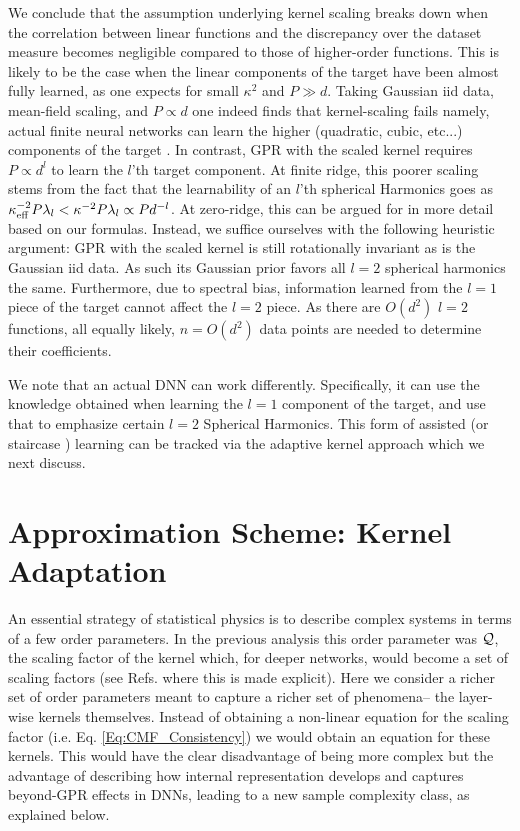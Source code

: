 We conclude that the assumption underlying kernel scaling breaks down when the correlation between linear functions and the discrepancy over the dataset measure becomes negligible compared to those of higher-order functions. This is likely to be the case when the linear components of the target have been almost fully learned, as one expects for small $\kappa^2$ and $P \gg d$. Taking Gaussian iid data, mean-field scaling, and $P \propto d$ one indeed finds that kernel-scaling fails namely, actual finite neural networks can learn the higher (quadratic, cubic, etc...) components of the target 
\citep{abbe2021staircasepropertyhierarchicalstructure,naveh2021self,  Cui2023,arous2021online,rubin2024a}. In contrast, GPR with the scaled kernel requires $P \propto d^l$ to learn the $l$'th target component. At finite ridge, this poorer scaling stems from the fact that the learnability of an $l$'th spherical Harmonics goes as  $\kappa^{-2}_{\text{eff}}P\lambda_l < \kappa^{-2} P\lambda_l \propto P d^{-l}$. At zero-ridge, this can be argued for in more detail based on our formulas. Instead, we suffice ourselves with the following heuristic argument: GPR with the scaled kernel is still rotationally invariant as is the Gaussian iid data. As such its Gaussian prior favors all $l=2$ spherical harmonics the same. Furthermore, due to spectral bias, information learned from the $l=1$ piece of the target cannot affect the $l=2$ piece. As there are $O(d^2)$ $l=2$ functions, all equally likely, $n=O(d^2)$ data points are needed to determine their coefficients. 

We note that an actual DNN can work differently. Specifically, it can use the knowledge obtained when learning the $l=1$ component of the target, and use that to emphasize certain $l=2$ Spherical Harmonics. This form of assisted (or staircase \cite{abbe2021staircasepropertyhierarchicalstructure}) learning can be tracked via the adaptive kernel approach which we next discuss.   

\section{Approximation Scheme: Kernel Adaptation}
\label{Sec:KernelAda}
An essential strategy of statistical physics is to describe complex systems in terms of a few order parameters. In the previous analysis this order parameter was ${\cal Q}$, the scaling factor of the kernel which, for deeper networks, would become a set of scaling factors (see Refs. \cite{LiSompolinsky2021,ariosto2022statistical} where this is made explicit). Here we consider a richer set of order parameters meant to capture a richer set of phenomena-- the layer-wise kernels themselves. Instead of obtaining a non-linear equation for the scaling factor (i.e. Eq. \eqref{Eq:CMF_Consistency}) we would obtain an equation for these kernels. This would have the clear disadvantage of being more complex but the advantage of describing how internal representation develops and captures beyond-GPR effects in DNNs, leading to a new sample complexity class, as explained below. 

